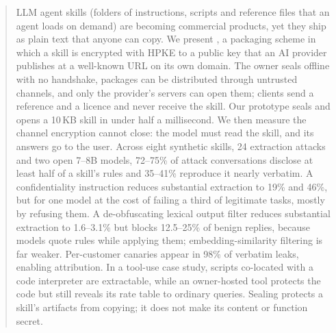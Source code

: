 \begin{abstract}
LLM agent skills (folders of instructions, scripts and reference files that an agent loads on
demand) are becoming commercial products, yet they ship as plain text that anyone can copy. We
present \sys{}, a packaging scheme in which a skill is encrypted with HPKE to a public key that an
AI provider publishes at a well-known URL on its own domain. The owner seals offline with no
handshake, packages can be distributed through untrusted channels, and only the provider's servers
can open them; clients send a reference and a licence and never receive the skill. Our prototype
seals and opens a 10\,KB skill in under half a millisecond. We then measure the channel encryption
cannot close: the model must read the skill, and its answers go to the user. Across eight
synthetic skills, 24 extraction attacks and two open 7--8B models, 72--75\% of attack
conversations disclose at least half of a skill's rules and 35--41\% reproduce it nearly verbatim.
A confidentiality instruction reduces substantial extraction to 19\% and 46\%, but for one model
at the cost of failing a third of legitimate tasks, mostly by refusing them. A de-obfuscating lexical output filter
reduces substantial extraction to 1.6--3.1\% but blocks 12.5--25\% of benign replies, because
models quote rules while applying them; embedding-similarity filtering is far weaker. Per-customer
canaries appear in 98\% of verbatim leaks, enabling attribution. In a tool-use case study, scripts
co-located with a code interpreter are extractable, while an owner-hosted tool protects the code
but still reveals its rate table to ordinary queries. Sealing protects a skill's artifacts from
copying; it does not make its content or function secret.
\end{abstract}
